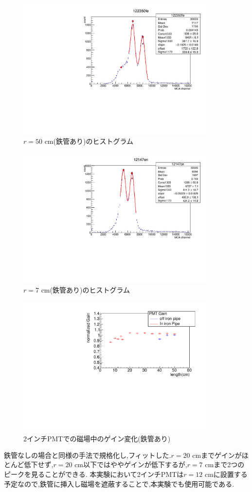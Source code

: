\begin{figure}[h]
	\centering
		\includegraphics[angle=-90,width=10cm]{fig/iguchi/122350fe.pdf}
	\caption{$r=50$ cm(鉄管あり)のヒストグラム}
	\label{hist50fe}
\end{figure}
\begin{figure}[h]
	\centering
		\includegraphics[angle=-90,width=10cm]{fig/iguchi/12147on.pdf}
	\caption{$r=7$ cm(鉄管あり)のヒストグラム}
	\label{hist7fe}
\end{figure}

\begin{figure}[h]
	\centering
		\includegraphics[angle=-90,width=10cm]{fig/iguchi/bigPMTfit.pdf}
	\caption{2インチPMTでの磁場中のゲイン変化(鉄管あり)}
	\label{bigPMTfit}
\end{figure}
鉄管なしの場合と同様の手法で規格化し,フィットした.$r=20$ cmまでゲインがほとんど低下せず,$r=20$ cm以下ではややゲインが低下するが,$r=7$ cmまで2つのピークを見ることができる.
本実験において2インチPMTは$r=12$ cmに設置する予定なので,鉄管に挿入し磁場を遮蔽することで,本実験でも使用可能である.

